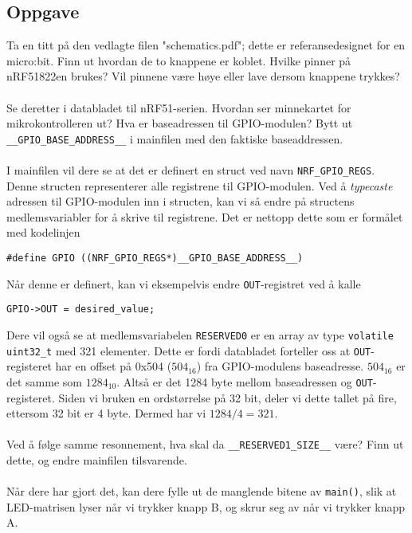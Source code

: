 \documentclass[11pt,a4paper]{article}
\begin{document}
\subsection{Oppgave}
Ta en titt på den vedlagte filen "schematics.pdf"; dette er referansedesignet for en micro:bit. Finn ut hvordan de to knappene er koblet. Hvilke pinner på nRF51822en brukes? Vil pinnene være høye eller lave dersom knappene trykkes?\\
\\
Se deretter i databladet til nRF51-serien. Hvordan ser minnekartet for mikrokontrolleren ut? Hva er baseadressen til GPIO-modulen? Bytt ut \texttt{__GPIO_BASE_ADDRESS__} i mainfilen med den faktiske baseaddressen.\\
\\
I mainfilen vil dere se at det er definert en struct ved navn \texttt{NRF_GPIO_REGS}. Denne structen representerer alle registrene til GPIO-modulen. Ved å \textit{typecaste} adressen til GPIO-modulen inn i structen, kan vi så endre på structens medlemsvariabler for å skrive til registrene. Det er nettopp dette som er formålet med kodelinjen
\begin{verbatim}
#define GPIO ((NRF_GPIO_REGS*)__GPIO_BASE_ADDRESS__)
\end{verbatim}
Når denne er definert, kan vi eksempelvis endre \texttt{OUT}-registret ved å kalle
\begin{verbatim}
GPIO->OUT = desired_value;
\end{verbatim}
Dere vil også se at medlemsvariabelen \texttt{RESERVED0} er en array av type \texttt{volatile uint32_t} med 321 elementer. Dette er fordi databladet forteller oss at \texttt{OUT}-registeret har en offset på 0x504 ($504_{16}$) fra GPIO-modulens baseadresse. $504_{16}$ er det samme som $1284_{10}$. Altså er det 1284 byte mellom baseadressen og \texttt{OUT}-registeret. Siden vi bruken en ordstørrelse på 32 bit, deler vi dette tallet på fire, ettersom 32 bit er 4 byte. Dermed har vi $1284 / 4 = 321$.\\
\\
Ved å følge samme resonnement, hva skal da \texttt{__RESERVED1_SIZE__} være? Finn ut dette, og endre mainfilen tilsvarende.\\
\\
Når dere har gjort det, kan dere fylle ut de manglende bitene av \texttt{main()}, slik at LED-matrisen lyser når vi trykker knapp B, og skrur seg av når vi trykker knapp A.
\end{document}
